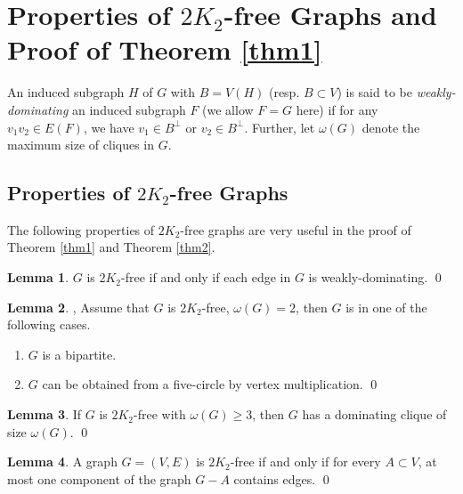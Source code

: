 \documentclass{amsart}
\theoremstyle{definition}
\newtheorem{lemma}{Lemma}
\begin{document}
\section{Properties of $2K_2$-free Graphs and Proof of Theorem \ref{thm1}}
An induced subgraph $H$ of $G$ with $B=V(H)$ (resp. $B\subset V$) is said to be {\em weakly-dominating}
an induced subgraph $F$ (we allow $F=G$ here) 
if for any $v_1v_2\in E(F)$, we have $v_1\in B^\perp$ or $v_2\in B^\perp$.
Further, let $\omega(G)$ denote the maximum size of cliques in $G$. 

\subsection{Properties of $2K_2$-free Graphs}
The following properties of $2K_2$-free graphs are very useful in the proof of Theorem \ref{thm1} and Theorem \ref{thm2}.

\begin{lemma}\label{trivial}
$G$ is $2K_2$-free if and only if each edge in $G$ is weakly-dominating. \qed
\end{lemma}

\begin{lemma}\label{lm1}{\cite[Theorem 2]{chung1990maximum}, \cite[Lemma 2]{broersma2014toughness}}
Assume that $G$ is $2K_2$-free, $\omega(G)=2$, then $G$ is in one of the following cases.
\begin{enumerate}
\item $G$ is a bipartite.
\item $G$ can be obtained from a five-circle by vertex multiplication. \qed
\end{enumerate}
\end{lemma}

\begin{lemma}\label{lm2}{\cite[Theorem 3]{chung1990maximum}}
If $G$ is $2K_2$-free with $\omega(G)\ge3$, then $G$ has a dominating clique of size $\omega(G)$. \qed
\end{lemma}

\begin{lemma}\label{lm3}{\cite[Observation 1]{broersma2014toughness}}
A graph $G=(V,E)$ is $2K_2$-free if and only if for every $A\subset V$, at most one component of the graph $G-A$ contains edges. \qed
\end{lemma}
\end{document}
